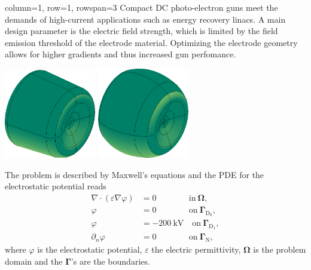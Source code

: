 \documentclass[
   accentcolor=9b,
   boxstyle=boxed
   ]{tudasciposter}
\begin{document}
\begin{tcbposter}[poster={columns=2, rows=8, spacing=1cm}]

\begin{posterboxenv}[title=Motivation]{column=1, row=1, rowspan=3}
   Compact DC photo-electron guns meet the demands of high-current applications such as energy recovery linacs. A main design parameter is the electric field strength, which is limited by the field emission threshold of the electrode material. Optimizing the electrode geometry allows for higher gradients and thus increased gun perfomance.
   \begin{center}
      \includegraphics[width=0.3\textwidth]{fig/electrode_init.png}
      \qquad \qquad \qquad
      \includegraphics[width=0.3\textwidth]{fig/electrode_opt.png}
   \end{center}
   The problem is described by Maxwell's equations and the PDE for the electrostatic potential reads
   \begin{align*}
      \nabla \cdot (\varepsilon \nabla \varphi) &= 0 \phantom{-00 kV} \quad \mathrm{in}\ \boldsymbol{\Omega},\\
      \varphi &= 0 \phantom{-00 kV} \quad \mathrm{on}\ \boldsymbol{\Gamma}_\mathrm{D_0},\\
      \varphi &= -200\ \mathrm{kV} \quad \mathrm{on}\ \boldsymbol{\Gamma}_\mathrm{D_1},\\
      \partial_n \varphi &= 0 \phantom{-00 kV} \quad \mathrm{on}\ \boldsymbol{\Gamma}_\mathrm{N},
      \end{align*}
   where $\varphi$ is the electrostatic potential, $\varepsilon$ the electric permittivity, $\boldsymbol{\Omega}$ is the problem domain and the $\boldsymbol{\Gamma}$'s are the boundaries.
\end{posterboxenv}


\end{tcbposter}
\end{document}
